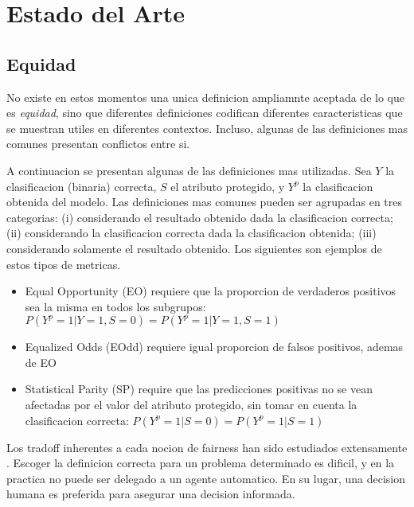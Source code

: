 \chapter{Estado del Arte}\label{chapter:state-of-the-art}


\section{Equidad}

No existe en estos momentos una unica definicion ampliamnte aceptada de lo que es \textit{equidad}, sino que diferentes definiciones codifican diferentes caracteristicas que se muestran utiles en diferentes contextos. Incluso, algunas de las definiciones mas comunes presentan conflictos entre si.

A continuacion se presentan algunas de las definiciones mas utilizadas. Sea $Y$ la clasificacion (binaria) correcta, $S$ el atributo protegido, y $Y^p$ la clasificacion obtenida del modelo. Las definiciones mas comunes pueden ser agrupadas en tres categorias: (i) considerando el resultado obtenido dada la clasificacion correcta; (ii) considerando la clasificacion correcta dada la clasificacion obtenida; (iii) considerando solamente el resultado obtenido. Los siguientes son ejemplos de estos tipos de metricas.

\begin{itemize}
    \item Equal Opportunity (EO) requiere que la proporcion de verdaderos positivos sea la misma en todos los subgrupos: $P(Y^p=1 | Y=1, S=0) = P(Y^p=1 | Y=1, S=1)$
    \item Equalized Odds (EOdd) requiere igual proporcion de falsos positivos, ademas de EO
    \item Statistical Parity (SP) require que las predicciones positivas no se vean afectadas por el valor del atributo protegido, sin tomar en cuenta la clasificacion correcta: $P(Y^p=1 | S=0) = P(Y^p=1 | S=1)$
\end{itemize}

Los tradoff inherentes a cada nocion de fairness han sido estudiados extensamente \cite{dwork2012fairness, friedler2016possibility, kleinberg2018inherent}. Escoger la definicion correcta para un problema determinado es dificil, y en la practica no puede ser delegado a un agente automatico. En su lugar, una decision humana es preferida para asegurar una decision informada.

